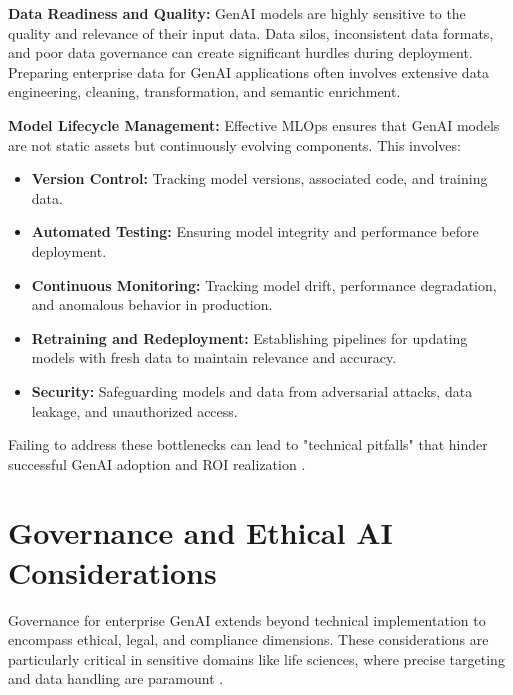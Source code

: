 \documentclass[10pt,twocolumn,letterpaper]{article}
\begin{document}
\textbf{Data Readiness and Quality:} GenAI models are highly sensitive to the quality and relevance of their input data. Data silos, inconsistent data formats, and poor data governance can create significant hurdles during deployment. Preparing enterprise data for GenAI applications often involves extensive data engineering, cleaning, transformation, and semantic enrichment.

\textbf{Model Lifecycle Management:} Effective MLOps ensures that GenAI models are not static assets but continuously evolving components. This involves:
\begin{itemize}
  \item \textbf{Version Control:} Tracking model versions, associated code, and training data.
  \item \textbf{Automated Testing:} Ensuring model integrity and performance before deployment.
  \item \textbf{Continuous Monitoring:} Tracking model drift, performance degradation, and anomalous behavior in production.
  \item \textbf{Retraining and Redeployment:} Establishing pipelines for updating models with fresh data to maintain relevance and accuracy.
  \item \textbf{Security:} Safeguarding models and data from adversarial attacks, data leakage, and unauthorized access.
\end{itemize}

Failing to address these bottlenecks can lead to "technical pitfalls" that hinder successful GenAI adoption and ROI realization \cite{openalex_w4400993506}.


\section{Governance and Ethical AI Considerations}


Governance for enterprise GenAI extends beyond technical implementation to encompass ethical, legal, and compliance dimensions. These considerations are particularly critical in sensitive domains like life sciences, where precise targeting and data handling are paramount \cite{crossref_10_2139_ssrn_6374778}.
\end{document}
